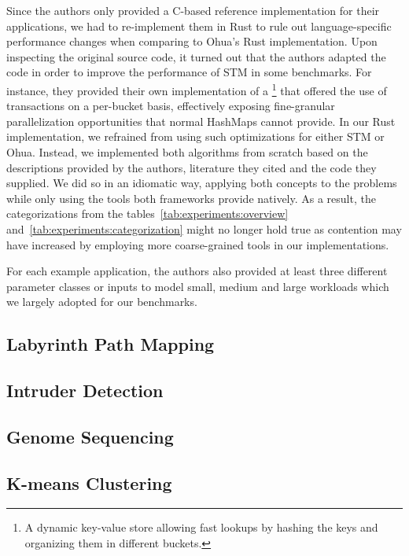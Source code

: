 Since the authors only provided a C-based reference implementation for their applications, we had to re-implement them in Rust to rule out language-specific performance changes when comparing to Ohua's Rust implementation.
Upon inspecting the original source code, it turned out that the authors adapted the code in order to improve the performance of STM in some benchmarks.
For instance, they provided their own implementation of a \footnote{A dynamic key-value store allowing fast lookups by hashing the keys and organizing them in different buckets.} that offered the use of transactions on a per-bucket basis, effectively exposing fine-granular parallelization opportunities that normal HashMaps cannot provide.
In our Rust implementation, we refrained from using such optimizations for either STM or Ohua.
Instead, we implemented both algorithms from scratch based on the descriptions provided by the authors, literature they cited and the code they supplied.
We did so in an idiomatic way, applying both concepts to the problems while only using the tools both frameworks provide natively.
As a result, the categorizations from the tables~\ref{tab:experiments:overview} and~\ref{tab:experiments:categorization} might no longer hold true as contention may have increased by employing more coarse-grained tools in our implementations.

For each example application, the authors also provided at least three different parameter classes or inputs to model small, medium and large workloads which we largely adopted for our benchmarks.



\subsection{Labyrinth Path Mapping}

\subsection{Intruder Detection}

\subsection{Genome Sequencing}

\subsection{K-means Clustering}






